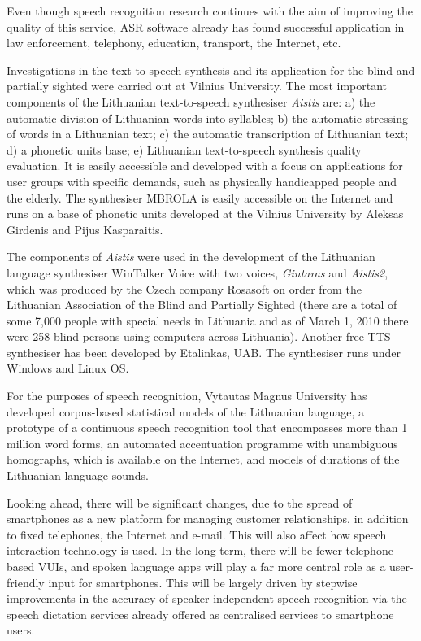 \begin{multicols}{2}
    Even though speech recognition research continues with the aim of improving the quality of this service, ASR software already has found successful application in law enforcement, telephony, education, transport, the Internet, etc.

Investigations in the text-to-speech synthesis and its application for the blind and partially sighted were carried out at Vilnius University. The most important components of the Lithuanian text-to-speech synthesiser \textit{Aistis} are: a) the automatic division of Lithuanian words into syllables; b) the automatic stressing of words in a Lithuanian text; c) the automatic transcription of Lithuanian text; d) a phonetic units base; e) Lithuanian text-to-speech synthesis quality evaluation. It is easily accessible and developed with a focus on applications for user groups with specific demands, such as physically handicapped people and the elderly. The synthesiser MBROLA is easily accessible on the Internet and runs on a base of phonetic units developed at the Vilnius University by Aleksas Girdenis and Pijus Kasparaitis.

The components of \textit{Aistis} were used in the development of the Lithuanian language synthesiser WinTalker Voice with two voices,  \textit{Gintaras} and  \textit{Aistis2}, which was produced by the Czech company Rosasoft on order from the Lithuanian Association of the Blind and Partially Sighted (there are a total of some 7,000 people with special needs in Lithuania and as of March 1, 2010 there were 258 blind persons using computers across Lithuania). Another free TTS synthesiser has been developed by  Etalinkas, UAB. The synthesiser runs under Windows and Linux OS.

For the purposes of speech recognition, Vytautas Magnus University has developed corpus-based statistical models of the Lithuanian language, a prototype of a continuous speech recognition tool that encompasses more than 1 million word forms, an automated accentuation programme with unambiguous homographs, which is available on the Internet, and models of durations of the Lithuanian language sounds.

Looking ahead, there will be significant changes, due to the spread of smartphones as a new platform for managing customer relationships, in addition to fixed telephones, the Internet and e-mail. This will also affect how speech interaction technology is used. In the long term, there will be fewer telephone-based VUIs, and spoken language apps will play a far more central role as a user-friendly input for smartphones. This will be largely driven by stepwise improvements in the accuracy of speaker-independent speech recognition via the speech dictation services already offered as centralised services to smartphone users.


\end{multicols}
